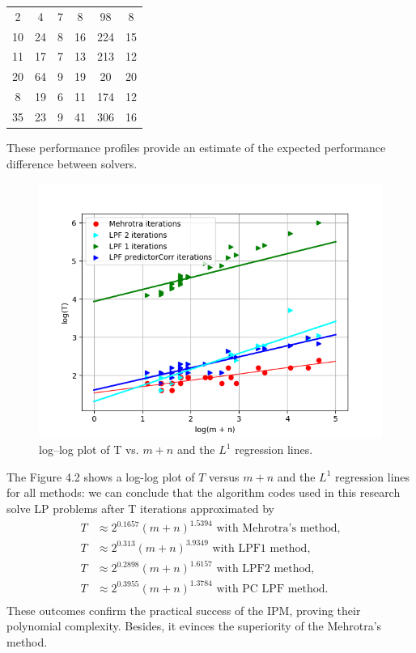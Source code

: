 \documentclass[a4paper,10 pt,titlepage,twoside]{book}
\theoremstyle{plain}
\theoremstyle{definition}
\theoremstyle{remark}
\begin{document}
{{\begin{table}
\begin{center}
\begin{tabular}{cccccc}
		2 & 4 & 7 & 8 & 98 & 8 \\
		10 & 24 & 8 & 16 & 224 & 15 \\
		11 & 17 & 7 & 13 & 213 & 12 \\
		20 & 64 & 9 & 19 & 20 & 20 \\
		8 & 19 & 6 & 11 & 174 & 12 \\
		35 & 23 & 9 & 41 & 306 & 16 \\ \hline
	\end{tabular}
\end{center}
\end{table}
These performance profiles provide an estimate of the expected performance difference
between solvers.
\begin{figure}\label{figure:T}
	\begin{center}
		\includegraphics[width= 15 cm]{numberiterations}\caption{log–log plot of T vs. $m + n$ and the $L^{1}$ regression lines.}
	\end{center}
\end{figure}
The Figure 4.2 shows a log-log plot of $T$ versus $m + n$ and the $L^{1}$ regression lines for all methods: we can conclude that the algorithm codes used in this research solve LP problems after T iterations approximated by
\begin{align*}
T& \approx 2^{0.1657}(m + n)^{1.5394} \text{ with Mehrotra's method,}\\
T &\approx 2^{0.313}(m + n)^{3.9349} \text{ with LPF1 method,}\\
T& \approx 2^{0.2898}(m + n)^{1.6157} \text{ with LPF2 method,}\\
T& \approx 2^{0.3955}(m + n)^{1.3784} \text{ with PC LPF method.}\\
\end{align*}
These outcomes confirm the practical success of the IPM, proving their polynomial complexity. Besides, it evinces the superiority of the Mehrotra's method. 
%

}}
\end{document}
